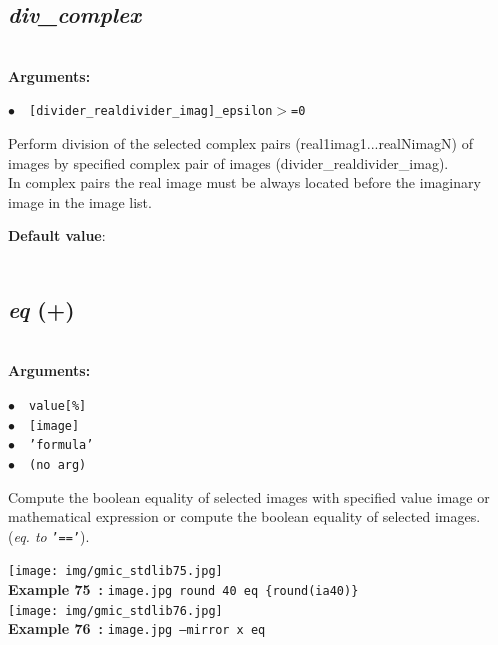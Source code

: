 \documentclass[a4paper,10.5pt,twoside]{book}
\def\comma{\discretionary{,}{}{,}}
\newcommand{\Cb}[1]{\textcolor{cb}{#1}}
\newcommand{\Cc}[1]{\textcolor{cc}{#1}}
\begin{document}
\subsection{\emph{div\_complex} }\vspace*{-0.7em}
~\\\textbf{\Cb{Arguments: }}\begin{flushleft}
{\small \Cb{\hspace*{0.5cm}$\bullet$~~\texttt{[divider\_real{\comma}divider\_imag]{\comma}\_epsilon$>$=0}}}\end{flushleft}
Perform division of the selected complex pairs (real1{\comma}imag1{\comma}...{\comma}realN{\comma}imagN) of images by specified complex pair of images (divider\_real{\comma}divider\_imag).
~\\In complex pairs{\comma} the real image must be always located before the imaginary image in the image list.
\begin{flushleft}\Cc{\textbf{Default value}:\\~\\\hspace*{0.5cm}{\small $\bullet$~~\texttt{'epsilon=1e-8'.}}}\end{flushleft}


\subsection{\emph{eq} (+)}\vspace*{-0.7em}
~\\\textbf{\Cb{Arguments: }}\begin{flushleft}
{\small \Cb{\hspace*{0.5cm}$\bullet$~~\texttt{value[\%]}}}~~~\\
{\small \Cb{\hspace*{0.5cm}$\bullet$~~\texttt{[image]}}}~~~\\
{\small \Cb{\hspace*{0.5cm}$\bullet$~~\texttt{'formula'}}}~~~\\
{\small \Cb{\hspace*{0.5cm}$\bullet$~~\texttt{(no arg)}}}\end{flushleft}
Compute the boolean equality of selected images with specified value{\comma} image or
mathematical expression{\comma} or compute the boolean equality of selected images.
~\\(\emph{eq. to} {\small \texttt{'=='}}).
\begin{center}\texttt{[image: img/gmic\_stdlib75.jpg]}\\
{\footnotesize \textbf{Example 75~:} \texttt{image.jpg round 40 eq \{round(ia{\comma}40)\}}}
\\\texttt{[image: img/gmic\_stdlib76.jpg]}\\
{\footnotesize \textbf{Example 76~:} \texttt{image.jpg --mirror x eq}}
\end{center}
\end{document}
